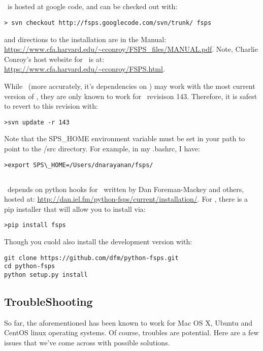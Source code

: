 \subsection{\fsps}
\fsps \ is hosted at google code, and can be checked out with:
\begin{verbatim}
> svn checkout http://fsps.googlecode.com/svn/trunk/ fsps
\end{verbatim}
and directions to the installation are in the Manual:
\url{https://www.cfa.harvard.edu/~cconroy/FSPS_files/MANUAL.pdf}.
Note, Charlie Conroy's host website for \fsps \ is at:
\url{https://www.cfa.harvard.edu/~cconroy/FSPS.html}.

While \pd \ (more accurately, it's dependencies on \pfsps) may
work with the most current version of \fsps, they are only known to
work for \fsps \ revisison 143.  Therefore, it is safest to revert to
this revision with:
\begin{verbatim}
>svn update -r 143
\end{verbatim}
Note that the SPS\_HOME environment variable must be set in your path
to point to the \fsps/src directory.  For example, in my .bashrc, I have:
\begin{verbatim}
>export SPS\_HOME=/Users/dnarayanan/fsps/
\end{verbatim}
\subsection{\pfsps}
\pd \ depends on python hooks for \fsps \ written by Dan
Foreman-Mackey and others, hosted at:
\url{http://dan.iel.fm/python-fsps/current/installation/}.  
For \pfsps, there is a pip installer that will allow you to install via:
\begin{verbatim}
>pip install fsps
\end{verbatim}
Though you cuold also install the development version with:
\begin{verbatim}
git clone https://github.com/dfm/python-fsps.git
cd python-fsps
python setup.py install
\end{verbatim}

\subsection{TroubleShooting}

So far, the aforementioned has been known to work for Mac OS X, Ubuntu
and CentOS linux operating systems. Of course, troubles are potential.
Here are a few issues that we've come across with possible solutions.

